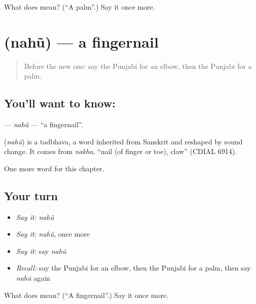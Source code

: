\begin{tcolorbox}[breakable,colback=teal!4,colframe=teal!35!black,title={Before you move on}]
What does  mean? (\textquotedblleft{}A palm\textquotedblright{}.) Say it once more.
\end{tcolorbox}
\section[\texorpdfstring{\pa{ਨਹੁੰ} (nahũ)}{ਨਹੁੰ (nahũ)}]{ (nahũ) — a fingernail}

\label{lesson:PA-C136-nahu}



\begin{quote}
Before the new one: say the Punjabi for an elbow, then the Punjabi for a palm.
\end{quote}

\subsection*{You'll want to know: }
\textbf{} — \emph{nahũ} — \textquotedblleft{}a fingernail\textquotedblright{}.

\begin{cousinweb}
\textbf{} (\emph{nahũ}) is a tadbhava, a word inherited from Sanskrit and reshaped by sound change. It comes from \emph{nakha}, \textquotedblleft{}nail (of finger or toe), claw\textquotedblright{} (CDIAL 6914).
\end{cousinweb}

\begin{grammarlens}[title={What you've built}]
One more word for this chapter.
\end{grammarlens}

\subsection*{Your turn}
\begin{itemize}
\raggedright
  \item \emph{Say it:} \emph{nahũ}
  \item \emph{Say it:} \emph{nahũ}, once more
  \item \emph{Say it:} say \emph{nahũ}
  \item \emph{Recall:} say the Punjabi for an elbow, then the Punjabi for a palm, then say \emph{nahũ} again
\end{itemize}

\begin{tcolorbox}[breakable,colback=teal!4,colframe=teal!35!black,title={Before you move on}]
What does  mean? (\textquotedblleft{}A fingernail\textquotedblright{}.) Say it once more.
\end{tcolorbox}
